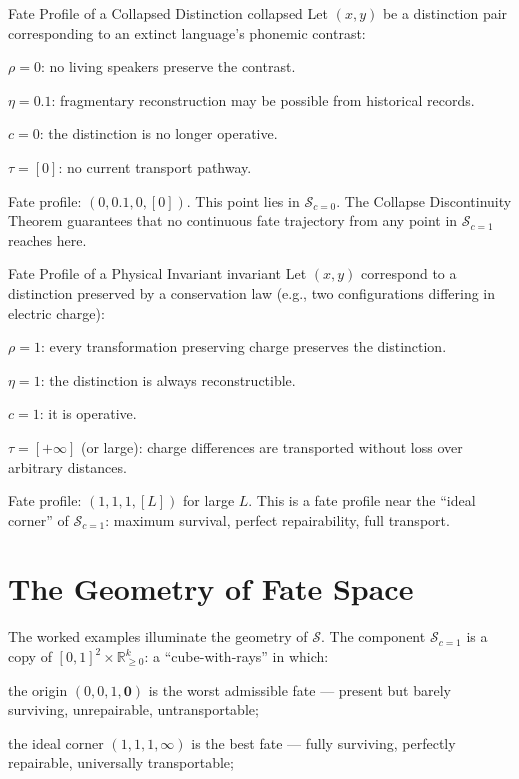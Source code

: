 \documentclass[12pt,twoside,openright]{book}
\newcommand{\fateSpace}{\mathcal{S}}
\newcommand{\survRatio}{\rho}             %
\newcommand{\repEff}{\eta}               %
\newcommand{\collapseInd}{c}             %
\newcommand{\fateComp}[1]{\fateSpace_{\collapseInd=#1}}
\providecommand{\fateComp}[1]{\fateSpace_{\collapseInd=#1}}
\begin{document}
\begin{example}{Fate Profile of a Collapsed Distinction}%
  {collapsed}
Let $(x,y)$ be a distinction pair corresponding to an extinct
language's phonemic contrast:

$\survRatio=0$: no living speakers preserve the contrast.

$\repEff=0.1$: fragmentary reconstruction may be possible
from historical records.

$\collapseInd=0$: the distinction is no longer operative.

$\tau=[0]$: no current transport pathway.

Fate profile: $(0, 0.1, 0, [0])$.
This point lies in $\fateComp{0}$. The Collapse
Discontinuity Theorem guarantees that no continuous fate
trajectory from any point in $\fateComp{1}$ reaches here.
\end{example}

\begin{example}{Fate Profile of a Physical Invariant}%
  {invariant}
Let $(x,y)$ correspond to a distinction preserved by a
conservation law (e.g., two configurations differing in
electric charge):

$\survRatio=1$: every transformation preserving charge
preserves the distinction.

$\repEff=1$: the distinction is always reconstructible.

$\collapseInd=1$: it is operative.

$\tau=[+\infty]$ (or large): charge differences are
transported without loss over arbitrary distances.

Fate profile: $(1, 1, 1, [L])$ for large $L$.
This is a fate profile near the ``ideal corner'' of $\fateComp{1}$:
maximum survival, perfect repairability, full transport.
\end{example}

\section{The Geometry of Fate Space}

The worked examples illuminate the geometry of $\fateSpace$.
The component $\fateComp{1}$ is a copy of $[0,1]^2\times
\mathbb{R}_{\ge0}^k$: a ``cube-with-rays'' in which:

the origin $(0,0,1,\mathbf{0})$ is the worst admissible fate
--- present but barely surviving, unrepairable, untransportable;

the ideal corner $(1,1,1,\boldsymbol{\infty})$ is the best
fate --- fully surviving, perfectly repairable, universally
transportable;
\end{document}

